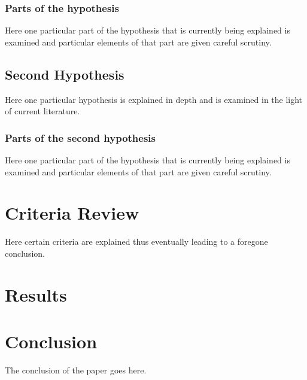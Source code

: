\subsubsection{Parts of the hypothesis}

Here one particular part of the hypothesis that is 
currently being explained is examined and particular
elements of that part are given careful scrutiny.


\subsection{Second Hypothesis}

Here one particular hypothesis is explained in depth
and is examined in the light of current literature.

\subsubsection{Parts of the second hypothesis}

Here one particular part of the hypothesis that is 
currently being explained is examined and particular
elements of that part are given careful scrutiny.

\section{Criteria Review}

Here certain criteria are explained thus eventually
leading to a foregone conclusion.

\section{Results}

\section{Conclusion}\label{conclusion3}

The conclusion of the paper goes here.

